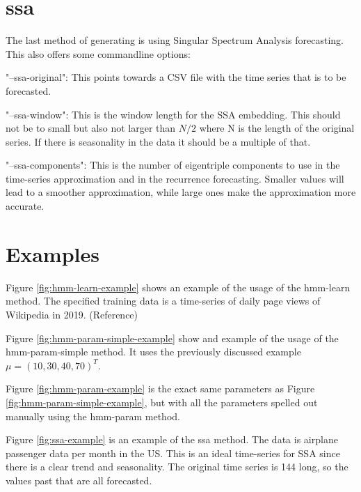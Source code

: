 \section{ssa}

The last method of generating is using Singular Spectrum Analysis forecasting. This also offers some commandline options: 

"--ssa-original": This points towards a CSV file with the time series that is to be forecasted. 

"--ssa-window": This is the window length for the SSA embedding. This should not be to small but also not larger than $N/2$ where N is the length of the original series. If there is seasonality in the data it should be a multiple of that. 

"--ssa-components": This is the number of eigentriple components to use in the time-series approximation and in the recurrence forecasting. Smaller values will lead to a smoother approximation, while large ones make the approximation more accurate. 

\section{Examples}

Figure \ref{fig:hmm-learn-example} shows an example of the usage of the hmm-learn method. The specified training data is a time-series of daily page views of Wikipedia in 2019. (Reference)

Figure \ref{fig:hmm-param-simple-example} show and example of the usage of the hmm-param-simple method. It uses the previously discussed example $\mu = (10, 30, 40, 70)^T$. 

Figure \ref{fig:hmm-param-example} is the exact same parameters as Figure \ref{fig:hmm-param-simple-example}, but with all the parameters spelled out manually using the hmm-param method. 

Figure \ref{fig:ssa-example} is an example of the ssa method. The data is airplane passenger data per month in the US. This is an ideal time-series for SSA since there is a clear trend and seasonality. The original time series is 144 long, so the values past that are all forecasted.

